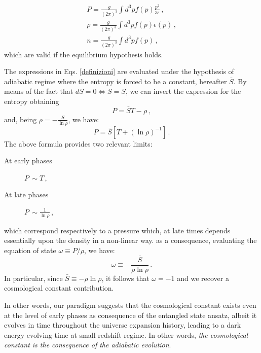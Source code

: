 \documentclass[nofootinbib,prd,superscriptaddress,showpacs,showkeys,]{revtex4}
\begin{document}
\begin{subequations}\label{definizioni}
\begin{align}
P=\frac{g}{(2\pi)^3}\int{d^3pf(p)\frac{p^2}{3\epsilon}}\,,\\
\rho=\frac{g}{(2\pi)^3}\int{d^3pf(p)\epsilon(p)}\,,\\
n=\frac{g}{(2\pi)^3}\int{d^3pf(p)}\,,
\end{align}
\end{subequations}
which are valid if  the equilibrium hypothesis holds.

The  expressions in Eqs. \eqref{definizioni} are evaluated under the hypothesis of adiabatic regime where the  entropy is forced to be a constant, hereafter $\bar S$. By means of the fact that $dS=0\Leftrightarrow S=\bar S$, we  can invert the expression for the entropy obtaining
\begin{equation}\label{prevst}
P=\bar S T-\rho\,,
\end{equation}
and, being  $\rho=-\frac{S}{\ln\rho}$, we  have:
\begin{equation}\label{obt}
P=\bar S\left[T+(\ln\rho)^{-1}\right]\,.
\end{equation}
The above formula provides two relevant limits:
\begin{description}
  \item[At early phases] $P\,\sim T$\,,\\
  \item[At late phases] $P\,\sim \frac{1}{\ln\rho}$\,,
\end{description}
which correspond respectively to a pressure which, at late times depends essentially upon the density in a non-linear way. as a consequence,  evaluating the equation of state $\omega\equiv P/\rho$, we have:
\begin{equation}\label{bd}
\omega\equiv-\frac{\bar S}{\rho\ln\rho}\,.
\end{equation}
In particular, since $\bar S\equiv -\rho\ln\rho$,  it follows that $\omega=-1$ and we recover a   cosmological constant contribution.

In other words, our paradigm suggests that the cosmological constant exists even at the level of early phases as consequence of the entangled state ansatz, albeit it evolves in time throughout the universe expansion history, leading to a dark energy evolving time at small redshift regime.  In other words, \textit{the cosmological constant is the consequence of the adiabatic evolution}.
\end{document}
